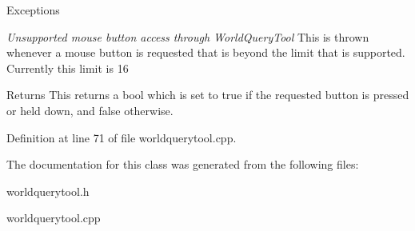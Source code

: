 \begin{DoxyExceptions}{Exceptions}
\item[{\em Unsupported mouse button access through WorldQueryTool}]This is thrown whenever a mouse button is requested that is beyond the limit that is supported. Currently this limit is 16 \end{DoxyExceptions}
\begin{DoxyReturn}{Returns}
This returns a bool which is set to true if the requested button is pressed or held down, and false otherwise. 
\end{DoxyReturn}


Definition at line 71 of file worldquerytool.cpp.



The documentation for this class was generated from the following files:\begin{DoxyCompactItemize}
\item 
worldquerytool.h\item 
worldquerytool.cpp\end{DoxyCompactItemize}
